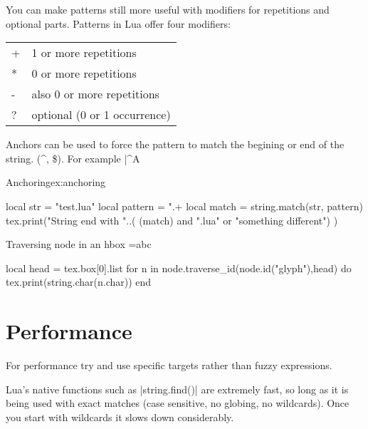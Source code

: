 You can make patterns still more useful with modifiers for repetitions and optional parts. Patterns in Lua offer four modifiers:

\begin{center}
\begin{tabular}{ll}
+	&1 or more repetitions\\
*	&0 or more repetitions\\
-	&also 0 or more repetitions\\
?	&optional (0 or 1 occurrence)\\
\end{tabular}
\end{center}

Anchors can be used to force the pattern to match the begining or end of the string. (\^{}, \$). For example 
|^A%

\begin{texexample}{Anchoring}{ex:anchoring}
\begin{luacode}
   local str = "test.lua"
   local pattern = ".+%
   local match = string.match(str, pattern)
   tex.print("String end with "..( (match) and ".lua" or "something different") )
\end{luacode}
\end{texexample}


\begin{texexample}{Traversing node in an hbox}{}
=\hbox{abc}
\begin{luacode}
  local head = tex.box[0].list
 for n in node.traverse_id(node.id("glyph"),head) do
     tex.print(string.char(n.char))
 end
\end{luacode}
\end{texexample}

\section{Performance}

For performance try and use specific targets rather than fuzzy expressions. 

Lua's native functions such as |string.find()| are extremely fast, so long as it is being used with exact matches (case sensitive, no globing, no wildcards). Once you start with wildcards it slows down considerably.

